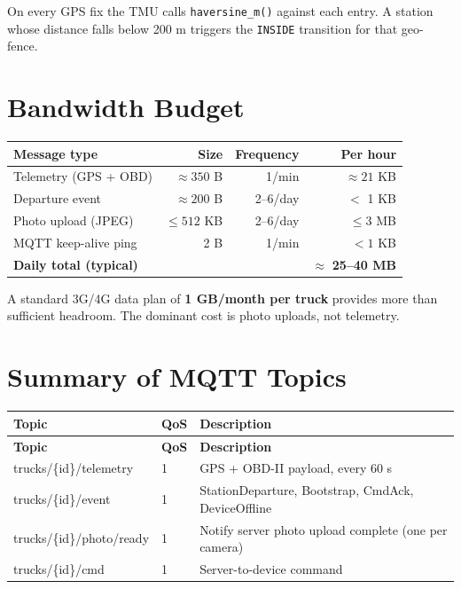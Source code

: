 \documentclass{article}
\begin{document}
\noindent On every GPS fix the TMU calls \texttt{haversine\_m()} against
each entry. A station whose distance falls below 200 m triggers the
\texttt{INSIDE} transition for that geo-fence.

\section{Bandwidth Budget}

\begin{center}
\begin{tabular}{lrrr}
\toprule
\textbf{Message type} & \textbf{Size} & \textbf{Frequency} & \textbf{Per hour}\\
\midrule
Telemetry (GPS + OBD) & $\approx 350$ B & 1/min & $\approx 21$ KB\\
Departure event       & $\approx 200$ B & 2--6/day & $<$ 1 KB\\
Photo upload (JPEG)   & $\leq 512$ KB   & 2--6/day & $\leq 3$ MB\\
MQTT keep-alive ping  & 2 B             & 1/min    & $< 1$ KB\\
\midrule
\textbf{Daily total (typical)} & & & $\approx$ \textbf{25--40 MB}\\
\bottomrule
\end{tabular}
\end{center}

\noindent A standard 3G/4G data plan of \textbf{1 GB/month per truck} provides
more than sufficient headroom. The dominant cost is photo uploads, not telemetry.

\section{Summary of MQTT Topics}

\begin{longtable}{>{\ttfamily\small}p{} p{} p{}}
\toprule
\textbf{Topic} & \textbf{QoS} & \textbf{Description}\\
\midrule
\endfirsthead
\toprule
\textbf{Topic} & \textbf{QoS} & \textbf{Description}\\
\midrule
\endhead
\bottomrule
\endfoot
trucks/\{id\}/telemetry   & 1 & GPS + OBD-II payload, every 60 s\\
trucks/\{id\}/event       & 1 & StationDeparture, Bootstrap, CmdAck, DeviceOffline\\
trucks/\{id\}/photo/ready & 1 & Notify server photo upload complete (one per camera)\\
trucks/\{id\}/cmd         & 1 & Server-to-device command\\
\end{longtable}
\end{document}
